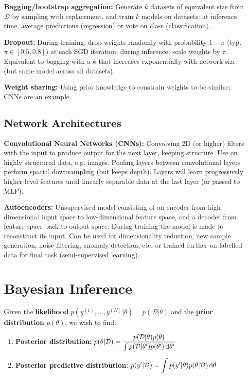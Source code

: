 \documentclass[twocolumn, 8pt]{extarticle}
\begin{document}
\textbf{Bagging/bootstrap aggregation:} Generate \(k\) datasets of equivalent size from \(\mathcal D\) by sampling with
replacement, and train \(k\) models on datasets; at inference time, average predictions (regression) or vote on class
(classification).

\textbf{Dropout:} During training, drop weights randomly with probability \(1 - \pi\) (typ. \(\pi \in [0.5, 0.8]\)) at
each SGD iteration; during inference, scale weights by \(\pi\). Equivalent to bagging with a \(k\) that increases
exponentially with network size (but same model across all datasets).

\textbf{Weight sharing:} Using prior knowledge to constrain weights to be similar; CNNs are an example.

\subsection{Network Architectures}

\textbf{Convolutional Neural Networks (CNNs):} Convolving 2D (or higher) filters with the input to produce output for
the next layer, keeping structure. Use on highly structured data, e.g. images. Pooling layers between convolutional
layers perform spacial downsampling (but keeps depth). Layers will learn progressively higher-level features until
linearly separable data at the last layer (or passed to MLP).

\textbf{Autoencoders:} Unsupervised model consisting of an encoder from high-dimensional input space to low-dimensional
feature space, and a decoder from feature space back to output space. During training the model is made to reconstruct
its input. Can be used for dimensionality reduction, new sample generation, noise filtering, anomaly detection, etc. or
trained further on labelled data for final task (semi-supervised learning).

\hrulefill
\section{Bayesian Inference} %

Given the \textbf{likelihood} \(p(y^{(1)}, \dots, y^{(N)} | \theta) = p(\mathcal D | \theta)\) and the \textbf{prior
distribution} \(p(\theta)\), we wish to find:
\begin{enumerate}
    \item \textbf{Posterior distribution:} \(\displaystyle p(\theta | \mathcal D) = \frac{p(\mathcal D | \theta)p(\theta)}{\int p(\mathcal D | \theta')p(\theta')\,\mathrm{d}\theta'}\)
    \item \textbf{Posterior predictive distribution:} \(\displaystyle p(y' | \mathcal D) = \int p(y' | \theta)p(\theta | \mathcal D)\,\mathrm{d}\theta\)
\end{enumerate}
\end{document}
